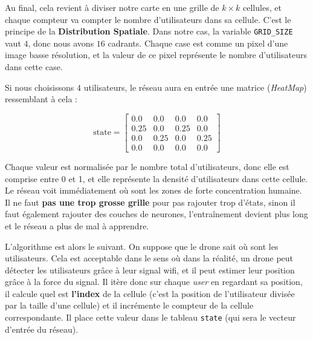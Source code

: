 \documentclass{article}
\begin{document}
Au final, cela revient à diviser notre carte en une grille de $k \times k$ cellules, et chaque compteur va compter le nombre d'utilisateurs dans sa cellule.
C'est le principe de la \textbf{Distribution Spatiale}.
Dans notre cas, la variable \texttt{GRID\_SIZE} vaut $4$, donc nous avons $16$ cadrants. Chaque case est comme un pixel d'une image basse résolution, 
et la valeur de ce pixel représente le nombre d'utilisateurs dans cette case.

\vspace{0.5cm}

Si nous choisissons $4$ utilisateurs, le réseau aura en entrée une matrice (\textit{HeatMap}) ressemblant à cela :

$$\text{state} = \left[ \begin{array}{cccc}
\text{0.0} & \text{0.0} & \text{0.0} & \text{0.0} \\
\text{0.25} & \text{0.0} & \text{0.25} & \text{0.0} \\
\text{0.0} & \text{0.25} & \text{0.0} & \text{0.25} \\
\text{0.0} & \text{0.0} & \text{0.0} & \text{0.0}
\end{array} \right]$$

\vspace{0.5cm}

Chaque valeur est normalisée par le nombre total d'utilisateurs, donc elle est comprise entre 0 et 1, 
et elle représente la densité d'utilisateurs dans cette cellule.
Le réseau voit immédiatement où sont les zones de forte concentration humaine.
Il ne faut \textbf{pas une trop grosse grille} pour pas rajouter trop d'états,
sinon il faut également rajouter des couches de neurones, l'entraînement devient plus long et le réseau a plus de mal à apprendre.

\vspace{0.5cm}

L'algorithme est alors le suivant. On suppose que le drone sait où sont les utilisateurs.
Cela est acceptable dans le sens où dans la réalité, un drone peut détecter les utilisateurs grâce à leur signal wifi,
et il peut estimer leur position grâce à la force du signal.
Il itère donc sur chaque \textit{user} en regardant sa position, il calcule quel est \textbf{l'index} de la cellule
(c'est la position de l'utilisateur divisée par la taille d'une cellule) et il incrémente le compteur de la cellule correspondante.
Il place cette valeur dans le tableau \texttt{state} (qui sera le vecteur d'entrée du réseau).

\vspace{0.5cm}
\end{document}
